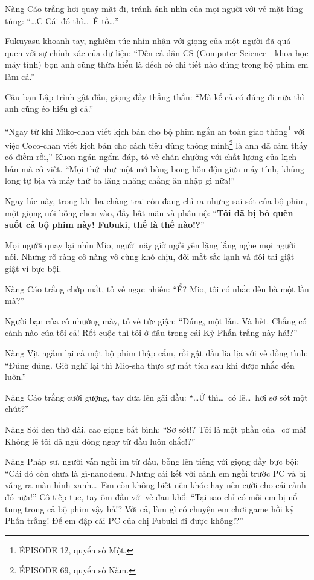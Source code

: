 \documentclass[../main.tex]{subfiles}
\begin{document}
Nàng Cáo trắng hơi quay mặt đi, tránh ánh nhìn của mọi người với vẻ mặt lúng túng: ``\dots  C-Cái đó thì\dots\ Ê-tồ\dots''

Fukuyasu khoanh tay, nghiêm túc nhìn nhận với giọng của một người đã quá quen với sự chính xác của dữ liệu: ``Đến cả dân CS (Computer Science - khoa học máy tính) bọn anh cũng thừa hiểu là đếch có chi tiết nào đúng trong bộ phim em làm cả.''

Cậu bạn Lập trình gật đầu, giọng đầy thẳng thắn: ``Mà kể cả có đúng đi nữa thì anh cũng éo hiểu gì cả.''

``Ngay từ khi Miko-chan viết kịch bản cho bộ phim ngắn an toàn giao thông\footnote{{\flaregothic ÉPISODE 12}, quyển số Một.} với việc Coco-chan viết kịch bản cho cách tiêu dùng thông minh\footnote{{\flaregothic ÉPISODE 69}, quyển số Năm.} là anh đã cảm thấy có điềm rồi,'' Kuon ngán ngẩm đáp, tỏ vẻ chán chường với chất lượng của kịch bản mà cô viết. ``Mọi thứ như một mớ bòng bong hỗn độn giữa máy tính, khủng long tự bịa và mấy thứ ba lăng nhăng chẳng ăn nhập gì nữa!''

Ngay lúc này, trong khi ba chàng trai còn đang chỉ ra những sai sót của bộ phim, một giọng nói bỗng chen vào, đầy bất mãn và phẫn nộ: ``\textbf{Tôi đã bị bỏ quên suốt cả bộ phim này! Fubuki, thế là thế nào!?}''

Mọi người quay lại nhìn Mio, người nãy giờ ngồi yên lặng lắng nghe mọi người nói. Nhưng rõ ràng cô nàng vô cùng khó chịu, đôi mắt sắc lạnh và đôi tai giật giật vì bực bội.

Nàng Cáo trắng chớp mắt, tỏ vẻ ngạc nhiên: ``Ể? Mio, tôi có nhắc đến bà một lần mà?''

Người bạn của cô nhướng mày, tỏ vẻ tức giận: ``Đúng, một lần. Và hết. Chẳng có cảnh nào của tôi cả! Rốt cuộc thì tôi ở đâu trong cái Kỷ Phấn trắng này hả!?''

Nàng Vịt ngẫm lại cả một bộ phim thập cẩm, rồi gật đầu lia lịa với vẻ đồng tình: ``Đúng đúng. Giờ nghĩ lại thì Mio-sha thực sự mất tích sau khi được nhắc đến luôn.''

Nàng Cáo trắng cười gượng, tay đưa lên gãi đầu: ``\dots Ừ thì\dots\ có lẽ\dots\ hơi sơ sót một chút?''

Nàng Sói đen thở dài, cao giọng bất bình: ``Sơ sót!? Tôi là một phần của \hll\ cơ mà! Không lẽ tôi đã ngủ đông ngay từ đầu luôn chắc!?''

Nàng Pháp sư, người vẫn ngồi im từ đầu, bỗng lên tiếng với giọng đầy bực bội: ``Cái đó còn chưa là gì-nanodesu. Nhưng cái kết với cảnh em ngồi trước PC và bị văng ra màn hình xanh\dots\ Em còn không biết nên khóc hay nên cười cho cái cảnh đó nữa!'' Cô tiếp tục, tay ôm đầu với vẻ đau khổ: ``Tại sao chỉ có mỗi em bị nổ tung trong cả bộ phim vậy hả!? Với cả, làm gì có chuyện em chơi game hồi kỷ Phấn trắng! Để em đập cái PC của chị Fubuki đi được không!?''
\end{document}
